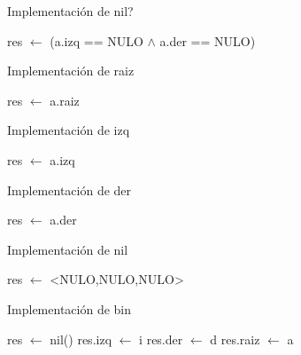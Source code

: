 \begin{Algoritmos}

\begin{algorithm}
\caption{Implementaci\'on de nil?}
\begin{algorithmic}[0]
	\State res $\gets$ (a.izq == NULO $\wedge$ a.der == NULO)
\EndFunction
\end{algorithmic}
\end{algorithm}

\begin{algorithm}
\caption{Implementaci\'on de raiz}
\begin{algorithmic}[0]
	\State res $\gets$ a.raiz
\EndFunction
\end{algorithmic}
\end{algorithm}

\begin{algorithm}
\caption{Implementaci\'on de izq}
\begin{algorithmic}[0]
	\State res $\gets$ a.izq
\EndFunction
\end{algorithmic}
\end{algorithm}

\begin{algorithm}
\caption{Implementaci\'on de der}
\begin{algorithmic}[0]
	\State res $\gets$ a.der
\EndFunction
\end{algorithmic}
\end{algorithm}

\begin{algorithm}
\caption{Implementaci\'on de nil}
\begin{algorithmic}[0]
	\State res $\gets$ <NULO,NULO,NULO>
\EndFunction
\end{algorithmic}
\end{algorithm}

\begin{algorithm}
\caption{Implementaci\'on de bin}
\begin{algorithmic}[0]
	\State res $\gets$ nil()
	\State res.izq $\gets$ i
	\State res.der $\gets$ d
	\State res.raiz $\gets$ a
\EndFunction
\end{algorithmic}
\end{algorithm}

\end{Algoritmos}